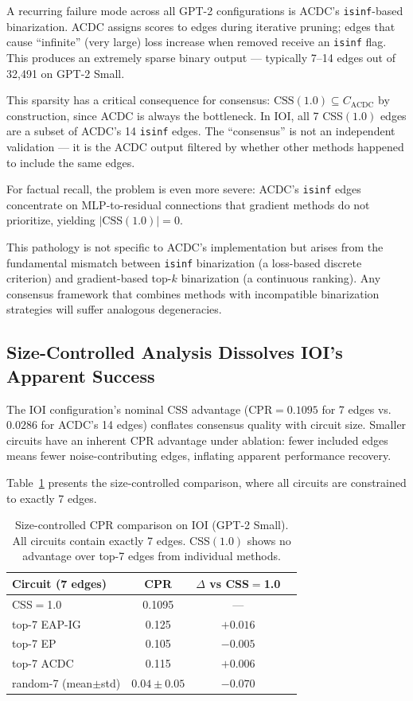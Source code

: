 \documentclass[11pt,a4paper]{article}
\begin{document}
A recurring failure mode across all GPT-2 configurations is ACDC's \texttt{isinf}-based binarization. ACDC assigns scores to edges during iterative pruning; edges that cause ``infinite'' (very large) loss increase when removed receive an \texttt{isinf} flag. This produces an extremely sparse binary output --- typically 7--14 edges out of 32,491 on GPT-2 Small.

This sparsity has a critical consequence for consensus: $\text{CSS}(1.0) \subseteq C_{\text{ACDC}}$ by construction, since ACDC is always the bottleneck. In IOI, all 7 CSS$(1.0)$ edges are a subset of ACDC's 14 \texttt{isinf} edges. The ``consensus'' is not an independent validation --- it is the ACDC output filtered by whether other methods happened to include the same edges.

For factual recall, the problem is even more severe: ACDC's \texttt{isinf} edges concentrate on MLP-to-residual connections that gradient methods do not prioritize, yielding $|\text{CSS}(1.0)| = 0$.

This pathology is not specific to ACDC's implementation but arises from the fundamental mismatch between \texttt{isinf} binarization (a loss-based discrete criterion) and gradient-based top-$k$ binarization (a continuous ranking). Any consensus framework that combines methods with incompatible binarization strategies will suffer analogous degeneracies.

\subsection{Size-Controlled Analysis Dissolves IOI's Apparent Success}
\label{sec:size}

The IOI configuration's nominal CSS advantage ($\text{CPR} = 0.1095$ for 7 edges vs.\ $0.0286$ for ACDC's 14 edges) conflates consensus quality with circuit size. Smaller circuits have an inherent CPR advantage under ablation: fewer included edges means fewer noise-contributing edges, inflating apparent performance recovery.

Table~\ref{tab:size_ctrl} presents the size-controlled comparison, where all circuits are constrained to exactly 7 edges.

\begin{table}[t]
\centering
\small
\caption{Size-controlled CPR comparison on IOI (GPT-2 Small). All circuits contain exactly 7 edges. CSS$(1.0)$ shows no advantage over top-7 edges from individual methods.}
\label{tab:size_ctrl}
\begin{tabular}{lccc}
\toprule
\textbf{Circuit (7 edges)} & \textbf{CPR} & \textbf{$\Delta$ vs CSS$=$1.0} \\
\midrule
CSS$=$1.0          & 0.1095 & --- \\
top-7 EAP-IG       & 0.125  & $+0.016$ \\
top-7 EP            & 0.105  & $-0.005$ \\
top-7 ACDC          & 0.115  & $+0.006$ \\
random-7 (mean$\pm$std) & $0.04 \pm 0.05$ & $-0.070$ \\
\bottomrule
\end{tabular}
\end{table}
\end{document}
